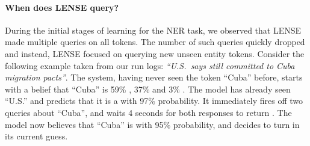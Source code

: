 \paragraph{When does LENSE query?}
During the initial stages of learning for the NER task, we observed that LENSE made multiple queries on all tokens.
The number of such queries quickly dropped and instead, LENSE focused on querying new unseen entity tokens.
Consider the following example taken from our run logs: \textit{``U.S.\ says still committed to Cuba migration pacts''}.
The system, having never seen the token ``Cuba'' before, starts with a belief that ``Cuba'' is 59\% \scper, 37\% \scloc{} and 3\% \scnone.
The model has already seen ``U.S.'' and predicts that it is a \scloc{} with 97\% probability.
It immediately fires off two queries about ``Cuba'', and waits 4 seconds for both responses to return \scloc{}.
The model now believes that ``Cuba'' is \scloc{} with 95\% probability, and decides to turn in its current guess.



